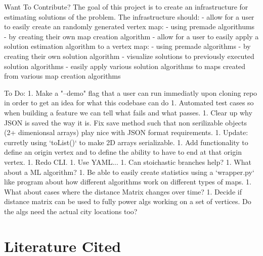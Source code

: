 \documentclass[12pt]{article}
\begin{document}
Want To Contribute?
The goal of this project is to create an infrastructure for estimating solutions of the problem.  The infrastructure should:
- allow for a user to easily create an randomly generated vertex map:
    - using premade algorithums
    - by creating their own map creation algorithm
- allow for a user to easily apply a solution estimation algorithm to a vertex map:
    - using premade algorithms
    - by creating their own solution algorithm
- visualize solutions to previously executed solution algorithms
- easily apply various solution algorithms to maps created from various map creation algorithms
  
  
To Do:
1.  Make a "--demo" flag that a user can run immediatly upon cloning repo in order to get an idea for what this codebase can do
1.  Automated test cases so when building a feature we can tell what fails and what passes.
1.  Clear up why JSON is saved the way it is.  Fix save method such that non serilizable objects (2+ dimenionsal arrays) play nice with JSON format requirements.
    1.  Update: curretly using `toList()` to make 2D arrays serializable.
1.  Add functionality to define an origin vertex and to define the ability to have to end at that origin vertex.
1.  Redo CLI.
1.  Use YAML...
1.  Can stoichastic branches help?
1.  What about a ML algorithm?
1.  Be able to easily create statistics using a `wrapper.py` like program about how different algorithms work on different types of maps.
1.  What about cases where the distance Matrix changes over time?
1.  Decide if distance matrix can be used to fully power algs working on a set of vertices.  Do the algs need the actual city locations too?



\section*{Literature Cited}
\end{document}
